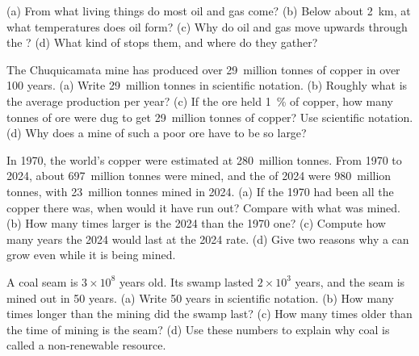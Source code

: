 \begin{exercise}[$\star\star$]\label{exo:g9:earth-resources:9}
(a) From what living things do most oil and gas come? (b) Below about
\qty{2}{km}, at what temperatures does oil form? (c) Why do oil and gas
move upwards through the ? (d) What kind of  stops them, and
where do they gather?
\end{exercise}

\begin{exercise}[$\star\star$]\label{exo:g9:earth-resources:10}
The Chuquicamata mine has produced over 29~million tonnes of copper in
over 100 years. (a) Write 29~million tonnes in scientific notation. (b)
Roughly what is the average production per year? (c) If the ore held
\qty{1}{\%} of copper, how many tonnes of ore were dug to get 29~million
tonnes of copper? Use scientific notation. (d) Why does a mine of such a
poor ore have to be so large?
\end{exercise}

\begin{exercise}[$\star\star\star$]\label{exo:g9:earth-resources:11}
In 1970, the world's copper  were estimated at 280~million tonnes.
From 1970 to 2024, about 697~million tonnes were mined, and the 
of 2024 were 980~million tonnes, with 23~million tonnes mined in 2024.
(a) If the 1970  had been all the copper there was, when would it
have run out? Compare with what was mined. (b) How many times larger is the
2024  than the 1970 one? (c) Compute how many years the 2024
 would last at the 2024 rate. (d) Give two reasons why a  can
grow even while it is being mined.
\end{exercise}

\begin{exercise}[$\star\star\star$]\label{exo:g9:earth-resources:12}
A coal seam is $3 \times 10^8$ years old. Its swamp lasted $2 \times 10^3$
years, and the seam is mined out in 50 years. (a) Write 50 years in
scientific notation. (b) How many times longer than the mining did the
swamp last? (c) How many times older than the time of mining is the seam?
(d) Use these numbers to explain why coal is called a non-renewable
resource.
\end{exercise}

